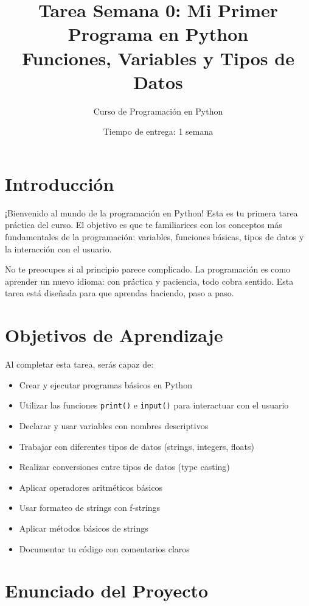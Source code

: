 \documentclass[12pt,a4paper]{article}
\title{\textbf{Tarea Semana 0: Mi Primer Programa en Python}\\
\large Funciones, Variables y Tipos de Datos}
\author{Curso de Programación en Python}
\date{Tiempo de entrega: 1 semana}
\begin{document}
\maketitle

\section{Introducción}

¡Bienvenido al mundo de la programación en Python! Esta es tu primera tarea práctica del curso. El objetivo es que te familiarices con los conceptos más fundamentales de la programación: variables, funciones básicas, tipos de datos y la interacción con el usuario.

No te preocupes si al principio parece complicado. La programación es como aprender un nuevo idioma: con práctica y paciencia, todo cobra sentido. Esta tarea está diseñada para que aprendas haciendo, paso a paso.

\section{Objetivos de Aprendizaje}

Al completar esta tarea, serás capaz de:

\begin{itemize}[leftmargin=*]
    \item Crear y ejecutar programas básicos en Python
    \item Utilizar las funciones \texttt{print()} e \texttt{input()} para interactuar con el usuario
    \item Declarar y usar variables con nombres descriptivos
    \item Trabajar con diferentes tipos de datos (strings, integers, floats)
    \item Realizar conversiones entre tipos de datos (type casting)
    \item Aplicar operadores aritméticos básicos
    \item Usar formateo de strings con f-strings
    \item Aplicar métodos básicos de strings
    \item Documentar tu código con comentarios claros
\end{itemize}

\section{Enunciado del Proyecto}
\end{document}
